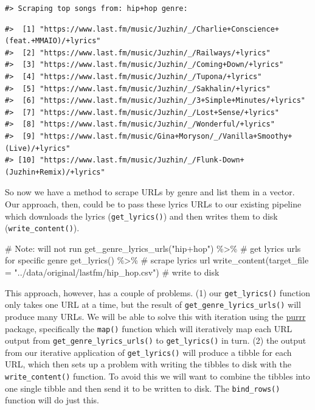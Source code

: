 \documentclass[
  letterpaper,
]{latex/krantz}
\newenvironment{Shaded}{\begin{snugshade}}{\end{snugshade}}
\newcommand{\AttributeTok}[1]{\textcolor[rgb]{0.40,0.45,0.13}{#1}}
\newcommand{\CommentTok}[1]{\textcolor[rgb]{0.37,0.37,0.37}{#1}}
\newcommand{\FunctionTok}[1]{\textcolor[rgb]{0.28,0.35,0.67}{#1}}
\newcommand{\NormalTok}[1]{\textcolor[rgb]{0.00,0.23,0.31}{#1}}
\newcommand{\SpecialCharTok}[1]{\textcolor[rgb]{0.37,0.37,0.37}{#1}}
\newcommand{\StringTok}[1]{\textcolor[rgb]{0.13,0.47,0.30}{#1}}
\begin{document}
\begin{verbatim}
#> Scraping top songs from: hip+hop genre:
\end{verbatim}

\begin{verbatim}
#>  [1] "https://www.last.fm/music/Juzhin/_/Charlie+Conscience+(feat.+MMAIO)/+lyrics"
#>  [2] "https://www.last.fm/music/Juzhin/_/Railways/+lyrics"                        
#>  [3] "https://www.last.fm/music/Juzhin/_/Coming+Down/+lyrics"                     
#>  [4] "https://www.last.fm/music/Juzhin/_/Tupona/+lyrics"                          
#>  [5] "https://www.last.fm/music/Juzhin/_/Sakhalin/+lyrics"                        
#>  [6] "https://www.last.fm/music/Juzhin/_/3+Simple+Minutes/+lyrics"                
#>  [7] "https://www.last.fm/music/Juzhin/_/Lost+Sense/+lyrics"                      
#>  [8] "https://www.last.fm/music/Juzhin/_/Wonderful/+lyrics"                       
#>  [9] "https://www.last.fm/music/Gina+Moryson/_/Vanilla+Smoothy+(Live)/+lyrics"    
#> [10] "https://www.last.fm/music/Juzhin/_/Flunk-Down+(Juzhin+Remix)/+lyrics"
\end{verbatim}

So now we have a method to scrape URLs by genre and list them in a
vector. Our approach, then, could be to pass these lyrics URLs to our
existing pipeline which downloads the lyrics (\texttt{get\_lyrics()})
and then writes them to disk (\texttt{write\_content()}).

\begin{Shaded}
\begin{Highlighting}[]
\CommentTok{\# Note: will not run}
\FunctionTok{get\_genre\_lyrics\_urls}\NormalTok{(}\StringTok{"hip+hop"}\NormalTok{) }\SpecialCharTok{\%\textgreater{}\%} \CommentTok{\# get lyrics urls for specific genre}
  \FunctionTok{get\_lyrics}\NormalTok{() }\SpecialCharTok{\%\textgreater{}\%} \CommentTok{\# scrape lyrics url}
  \FunctionTok{write\_content}\NormalTok{(}\AttributeTok{target\_file =} \StringTok{"../data/original/lastfm/hip\_hop.csv"}\NormalTok{) }\CommentTok{\# write to disk}
\end{Highlighting}
\end{Shaded}

This approach, however, has a couple of problems. (1) our
\texttt{get\_lyrics()} function only takes one URL at a time, but the
result of \texttt{get\_genre\_lyrics\_urls()} will produce many URLs. We
will be able to solve this with iteration using the \href{}{purrr}
package, specifically the \texttt{map()} function which will iteratively
map each URL output from \texttt{get\_genre\_lyrics\_urls()} to
\texttt{get\_lyrics()} in turn. (2) the output from our iterative
application of \texttt{get\_lyrics()} will produce a tibble for each
URL, which then sets up a problem with writing the tibbles to disk with
the \texttt{write\_content()} function. To avoid this we will want to
combine the tibbles into one single tibble and then send it to be
written to disk. The \texttt{bind\_rows()} function will do just this.
\end{document}
